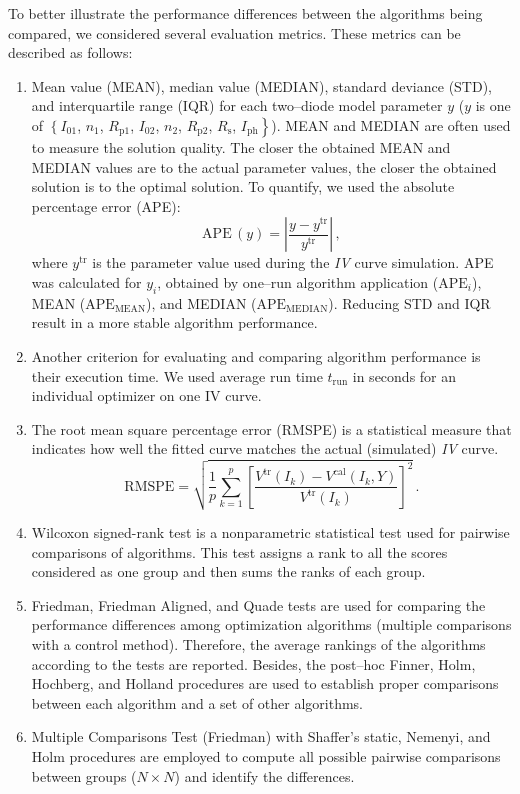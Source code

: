 \documentclass[a4paper,fleqn]{cas-sc}
\begin{document}
To better illustrate the performance differences between the algorithms being compared,
we considered several evaluation metrics.
These metrics can be described as follows:
\begin{enumerate}[1.]
\item
Mean value (MEAN), median value (MEDIAN), standard deviance (STD), and interquartile range (IQR)
for each two--diode model parameter $y$
($y$ is one of $\left\{I_{01}\right.$, $n_1$, $R_\mathrm{p1}$, $I_{02}$, $n_2$, $R_\mathrm{p2}$, $R_\mathrm{s}$, $\left.I_\mathrm{ph}\right\}$).
MEAN and MEDIAN are often used to measure the solution quality.
The closer the obtained MEAN and MEDIAN values are to the actual parameter values,
the closer the obtained solution is to the optimal solution.
To quantify, we used the  absolute percentage error (APE):
\begin{equation}
\label{eqAPE}
\mathrm{APE}\,(y)= \left| \frac{y-y^\mathrm{tr}}{y^\mathrm{tr}}\right|\,,
\end{equation}
where
$y^\mathrm{tr}$ is the parameter value used during the \emph{IV} curve simulation.
APE was calculated for $y_i$, obtained by one--run algorithm application ($\mathrm{APE}_i$),
MEAN ($\mathrm{APE}_\mathrm{MEAN}$), and MEDIAN ($\mathrm{APE}_\mathrm{MEDIAN}$).
Reducing STD and IQR result in a more stable algorithm performance.

\item
Another criterion for evaluating and comparing algorithm performance is their execution time.
We used average run time $t_\mathrm{run}$ in seconds for an
individual optimizer on one IV curve.

\item
The root mean square percentage error (RMSPE) is a statistical measure that indicates
how well the fitted curve matches the actual (simulated) \emph{IV} curve.
\begin{equation}
\label{eqRMSPE}
\mathrm{RMSPE}= \sqrt{\frac{1}{p} \sum_{k=1}^p \left[\frac{V^\mathrm{tr}(I_k)-V^\mathrm{cal}(I_k,Y)}{V^\mathrm{tr}(I_k)} \right]^2}\,.
\end{equation}

\item
Wilcoxon signed-rank test is a nonparametric statistical test used for pairwise comparisons of algorithms.
This test assigns a rank to all the scores considered as one group and then sums the ranks of each group.

\item
Friedman, Friedman Aligned, and Quade tests are used for comparing the performance differences
among optimization algorithms
(multiple comparisons with a control method).
Therefore, the average rankings of the algorithms according to the
tests are reported.
Besides, the post--hoc  Finner, Holm, Hochberg, and Holland procedures
are used to establish proper comparisons between each algorithm and a set of other algorithms.

\item
Multiple Comparisons Test (Friedman) with Shaffer’s static, Nemenyi, and Holm procedures
are employed to compute all possible pairwise comparisons between groups ($N\times N$)
and identify the differences.

\end{enumerate}
\end{document}
